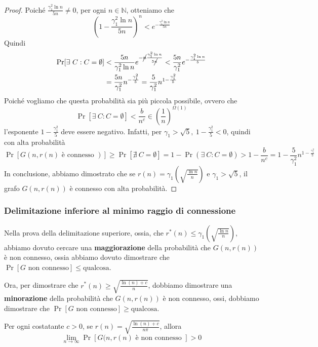 \begin{proof}
 Poiché $\frac{\gamma_1^2\ln n}{5n} \neq 0$, per ogni $n \in \mathbb{N}$, otteniamo che
\[
\left(1 - \frac{\gamma_1^2\ln n}{5n}\right)^n < e^{-\frac{\gamma_1^2\ln n}{5n}}
\]
Quindi
\begin{align*}  
\Pr[\exists\ C: C = \emptyset] &< \frac{5n}{\gamma_1^2\ln n}e^{-\cancel{n}\frac{\gamma_1^2\ln n}{5\cancel{n}}} < \frac{5n}{\gamma_1^2}e^{-\frac{\gamma_1^2\ln n}{5}} \\
&= \frac{5n}{\gamma_1^2}n^{-\frac{\gamma_1^2}{5}} = \frac{5}{\gamma_1^2}n^{1 - \frac{\gamma_1^2}{5}}
\end{align*}
Poiché vogliamo che questa probabilità sia più piccola possibile, ovvero che
\[
\Pr[\exists\ C: C = \emptyset] < \frac{b}{n^c} \in \left(\frac{1}{n}\right)^{\Omega(1)}
\]
l'esponente $1 - \frac{\gamma_1^2}{5}$ deve essere negativo. Infatti, per $\gamma_1 > \sqrt{5},\ 1 - \frac{\gamma_1^2}{5} < 0$, quindi
con alta probabilità
\[
\Pr[G(n, r(n) \text{ è connesso })] \geq \Pr[\nexists\ C = \emptyset] = 1 - \Pr(\exists\ C: C = \emptyset) > 1 - \frac{b}{n^c} = 1 - \frac{5}{\gamma_1^2}n^{1 - \frac{\gamma_1^2}{5}} 
\]
In conclusione, abbiamo dimostrato che se $r(n) = \gamma_1\left(\sqrt{\frac{\ln n}{n}}\right)$ e $\gamma_1 > \sqrt{5}$, il grafo $G(n, r(n))$ è connesso con alta probabilità.
\end{proof}

\subsubsection{Delimitazione inferiore al minimo raggio di connessione}

\begin{osservazione}
    Nella prova della delimitazione superiore, ossia, che $r^*(n) \leq \gamma_1\left(\sqrt{\frac{\ln n}{n}}\right)$, abbiamo dovuto cercare una \textbf{maggiorazione} della probabilità che $G(n, r(n))$ è non connesso, ossia abbiamo dovuto dimostrare che $\Pr[G \text{ non connesso}] \leq \text{qualcosa}$.

     Ora, per dimostrare che $r^*(n) \geq \sqrt{\frac{\ln (n) + c}{n}}$, dobbiamo dimostrare una \textbf{minorazione} della probabilità che $G(n, r(n))$ è non connesso, ossi, dobbiamo dimostrare che $\Pr[G \text{ non connesso}] \geq \text{qualcosa}$.
\end{osservazione}

\begin{teorema}
    Per ogni costatante $c > 0$, se $r(n) = \sqrt{\frac{\ln(n) + c}{n \pi}}$, allora 
    \[\lim_{n \rightarrow \infty} \Pr[G(n, r(n) \text{ è non connesso }] > 0
    \]
\end{teorema}

